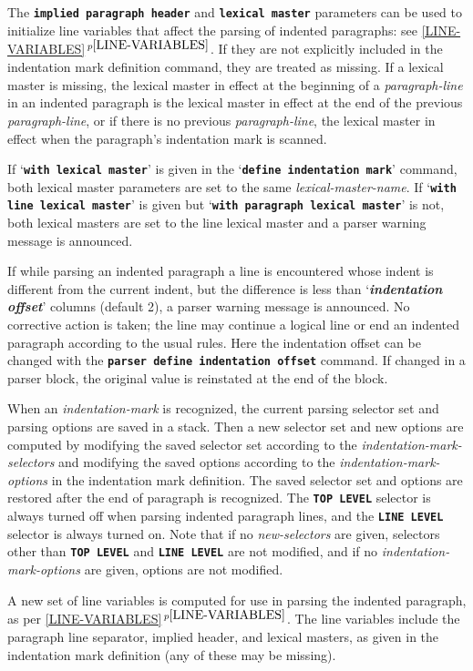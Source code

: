 \documentclass[12pt]{article}
\newcommand{\TT}[1]{{\tt \bfseries #1}}
\newcommand{\key}[1]{{\bf \em #1}\index{#1}}
\newcommand{\itemref}[1]{\ref{#1}$\,^{p\pageref{#1}}$}
\begin{document}
The \TT{implied paragraph header} and \TT{lexical master} parameters
can be used to initialize line variables
that affect the parsing of indented paragraphs: see \itemref{LINE-VARIABLES}.
If they are not explicitly included in the indentation mark definition command,
they are treated as missing.  If a lexical master is missing,
the lexical master in effect at the beginning of a {\em paragraph-line}
in an indented paragraph
is the lexical master in effect at the end of the previous
{\em paragraph-line}, or if there is no previous {\em paragraph-line},
the lexical master in effect when the paragraph's
indentation mark is scanned.

If `\TT{with lexical master}' is given in the `\TT{define indentation mark}'
command, both lexical master parameters are set to the same
{\em lexical-master-name}.  If `\TT{with line lex\-ical master}' is
given but `\TT{with paragraph lexical master}' is not, both lexical
masters are set to the line lexical master and a parser warning message
is announced.

If while parsing an indented paragraph a line is encountered whose
indent is different from the current indent,
but the difference is less than `\key{indentation offset}'
columns (default 2),
a parser warning message is announced.
No corrective action is taken; the line may continue a logical line
or end an indented paragraph according to the usual rules.
Here the indentation offset can be
changed with the \TT{parser define indentation offset} command.
If changed in a parser block, the original value is reinstated at the
end of the block.

When an {\em indentation-mark} is recognized, the current parsing
selector set and parsing options are saved in a stack.
Then a new selector set and new options are computed by modifying
the saved selector set
according to the {\em indentation-mark-selectors}
and modifying the saved options according
to the {\em indentation-mark-options} in the indentation mark definition.
The saved selector set and options
are restored after the end of paragraph is recognized.
The \TT{TOP LEVEL} selector is always turned off when parsing indented
paragraph lines, and the \TT{LINE LEVEL} selector is always turned on.
Note that if no {\em new-selectors} are given, selectors
other than \TT{TOP LEVEL} and \TT{LINE LEVEL}
are not modified, and if no {\em indentation-mark-options} 
are given, options are not modified.

A new set of line variables is computed for use in parsing the
indented paragraph, as per \itemref{LINE-VARIABLES}.
The line variables include the paragraph line separator,
implied header, and lexical masters, as given in
the indentation mark definition (any of these may be missing).
\end{document}
